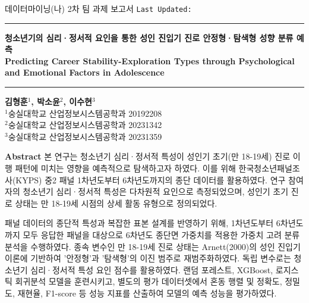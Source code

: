 \begin{center}
  \thispagestyle{empty}

  \noindent 데이터마이닝(나) 2차 팀 과제 보고서 \hfill \small \makeatletter\texttt{Last Updated: \@date}\makeatother \\
  \noindent\rule{\textwidth}{0.5pt}\par

  \vspace{2em}

  \huge \textbf{청소년기의 심리·정서적 요인을 통한 성인 진입기 진로 안정형·탐색형 성향 분류 예측} %
  \vspace{0.5em}
  \\
  \large \textbf{Predicting Career Stability-Exploration Types through Psychological and Emotional Factors in Adolescence} \\

  \vspace{1em}
  \noindent\rule{\textwidth}{0.5pt}\par

  \vspace{1em}

  \small \textbf{김형훈$^1$, 박소윤$^2$, 이수현$^3$}
  \vspace{0.5em}
  \\
  \small $^1$숭실대학교 산업정보시스템공학과 20192208 \\
  \small $^2$숭실대학교 산업정보시스템공학과 20231342 \\
  \small $^3$숭실대학교 산업정보시스템공학과 20231359

  \vspace{1em}

  \noindent\textbf{Abstract}
  본 연구는 청소년기 심리·정서적 특성이 성인기 초기(만 18-19세) 진로 이행 패턴에 미치는 영향을 예측적으로 탐색하고자 하였다. 이를 위해 한국청소년패널조사(KYPS) 중2 패널 1차년도부터 6차년도까지의 종단 데이터를 활용하였다. 연구 참여자의 청소년기 심리·정서적 특성은 다차원적 요인으로 측정되었으며, 성인기 초기 진로 상태는 만 18-19세 시점의 상세 활동 유형으로 정의되었다.

  패널 데이터의 종단적 특성과 복잡한 표본 설계를 반영하기 위해, 1차년도부터 6차년도까지 모두 응답한 패널을 대상으로 6차년도 종단면 가중치를 적용한 가중치 고려 분류 분석을 수행하였다. 종속 변수인 만 18-19세 진로 상태는 Arnett(2000)의 성인 진입기 이론에 기반하여 '안정형'과 '탐색형'의 이진 범주로 재범주화하였다. 독립 변수로는 청소년기 심리·정서적 특성 요인 점수를 활용하였다. 랜덤 포레스트, XGBoost, 로지스틱 회귀분석 모델을 훈련시키고, 별도의 평가 데이터셋에서 혼동 행렬 및 정확도, 정밀도, 재현율, F1-score 등 성능 지표를 산출하여 모델의 예측 성능을 평가하였다.


\end{center}
